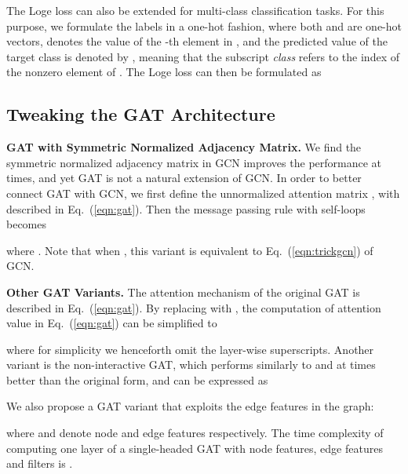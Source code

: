 \documentclass[sigconf,screen,nonacm]{acmart} \usepackage{booktabs}
\newcommand{\minisection}[1]{\vspace{5pt}\noindent\textbf{#1.}}
\newcommand{\lossname}{{Loge }}
\begin{document}
	The \lossname loss can also be extended for multi-class classification tasks.  For this purpose, we formulate the labels in a one-hot fashion, where both  and  are one-hot vectors,  denotes the value of the -th element in , and the predicted value of the target class is denoted by , meaning that the subscript \textit{class} refers to the index of the nonzero element of .
	The \lossname loss can then be formulated as

	
	\subsection{Tweaking the GAT Architecture}
	\minisection{GAT with Symmetric Normalized Adjacency Matrix}
	We find the symmetric normalized adjacency matrix in GCN improves the performance at times, and yet GAT is not a natural extension of GCN. In order to better connect GAT with GCN, we first define the unnormalized attention matrix , with  described in Eq.~(\ref{eqn:gat}).  Then the message passing rule with self-loops becomes

	where . 
	Note that when , this variant is equivalent to Eq.~(\ref{eqn:trickgcn}) of GCN.




	\minisection{Other GAT Variants}
The attention mechanism of the original GAT is described in Eq.~(\ref{eqn:gat}).  By replacing  with , the computation of attention value in Eq.~(\ref{eqn:gat}) can be simplified to

	where for simplicity we henceforth omit the layer-wise superscripts.
    Another variant is the non-interactive GAT, which performs similarly to and at times better than the original form, and can be expressed as

    We also propose a GAT variant that exploits the edge features in the graph:

	where  and  denote node and edge features respectively. The time complexity of computing one layer of a single-headed GAT with  node features,  edge features and  filters is .
	














	
	
\end{document}
